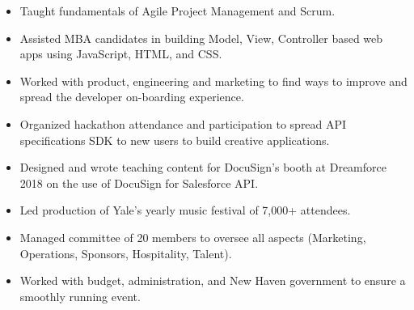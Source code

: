 \documentclass[10pt,a4paper,ragged2e]{altacv}
\begin{document}
\begin{itemize}
\item Taught fundamentals of Agile Project Management and Scrum.
\item Assisted MBA candidates in building Model, View, Controller based web apps using JavaScript, HTML, and CSS.
\end{itemize}
\divider

\begin{itemize}
\item Worked with product, engineering and marketing to find ways to improve and spread the developer on-boarding experience.
\item Organized hackathon attendance and participation to spread API specifications SDK to new users to build creative applications.
\item Designed and wrote teaching content for DocuSign's booth at Dreamforce 2018 on the use of DocuSign for Salesforce API.
\end{itemize}
\divider

\begin{itemize}
\item Led production of Yale's yearly music festival of 7,000+ attendees.
\item Managed committee of 20 members to oversee all aspects (Marketing, Operations, Sponsors, Hospitality, Talent).
\item Worked with budget, administration, and New Haven government to ensure a smoothly running event.
\end{itemize}


\clearpage

\end{document}
